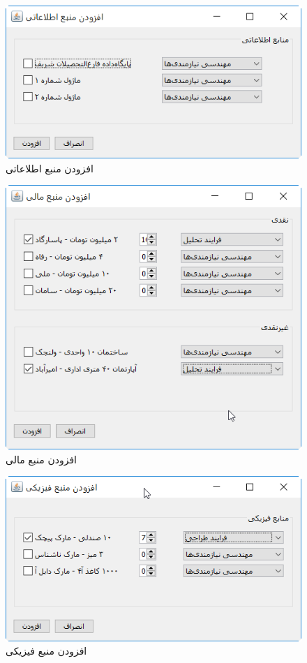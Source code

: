 \begin{figure}[H]
	\centering
	\includegraphics[scale=0.8]{img/prot/AddInformationResource}
	\caption{افزودن منبع اطلاعاتی}
\end{figure}
\begin{figure}[H]
	\centering
	\includegraphics[scale=0.8]{img/prot/AddFinanceResource}
	\caption{افزودن منبع مالی}
\end{figure}
\begin{figure}[H]
	\centering
	\includegraphics[scale=0.8]{img/prot/AddPhysicalResource}
	\caption{افزودن منبع فیزیکی}
\end{figure}


